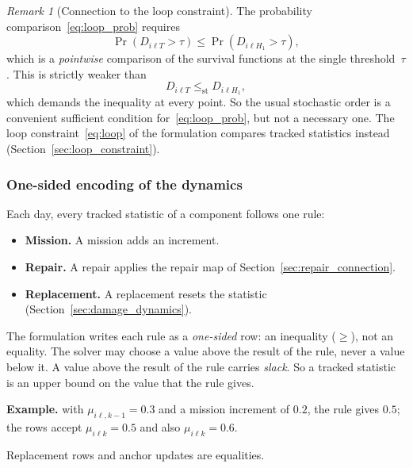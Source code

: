 \documentclass[11pt,a4paper]{article}
\theoremstyle{plain}
\theoremstyle{definition}
\theoremstyle{remark}
\newtheorem{remark}[theorem]{Remark}
\begin{document}
\begin{remark}[Connection to the loop constraint]
The probability comparison~\eqref{eq:loop_prob} requires
\begin{equation}
  \Pr(D_{i\ell T} > \tau) \le \Pr(D_{i\ell H_1} > \tau),
\end{equation}
which is a \emph{pointwise} comparison of the survival functions at the single threshold~$\tau$.
This is strictly weaker than
\begin{equation}
  D_{i\ell T} \le_{\mathrm{st}} D_{i\ell H_1},
\end{equation}
which demands the inequality at every point.
So the usual stochastic order is a convenient sufficient condition for~\eqref{eq:loop_prob}, but not a necessary one.
The loop constraint~\eqref{eq:loop} of the formulation compares tracked statistics instead (Section~\ref{sec:loop_constraint}).
\end{remark}

\subsubsection{One-sided encoding of the dynamics}
\label{sec:encoding}

Each day, every tracked statistic of a component follows one rule:
\begin{itemize}
  \item \textbf{Mission.} A mission adds an increment.
  \item \textbf{Repair.} A repair applies the repair map of Section~\ref{sec:repair_connection}.
  \item \textbf{Replacement.} A replacement resets the statistic (Section~\ref{sec:damage_dynamics}).
\end{itemize}
The formulation writes each rule as a \emph{one-sided} row: an inequality ($\ge$), not an equality.
The solver may choose a value above the result of the rule, never a value below it.
A value above the result of the rule carries \emph{slack}.
So a tracked statistic is an upper bound on the value that the rule gives.

\begin{examplebox}
\textbf{Example.} with $\mu_{i\ell,k-1} = 0.3$ and a mission increment of $0.2$, the rule gives $0.5$; the rows accept $\mu_{i\ell k} = 0.5$ and also $\mu_{i\ell k} = 0.6$.
\end{examplebox}

Replacement rows and anchor updates are equalities.
\end{document}
